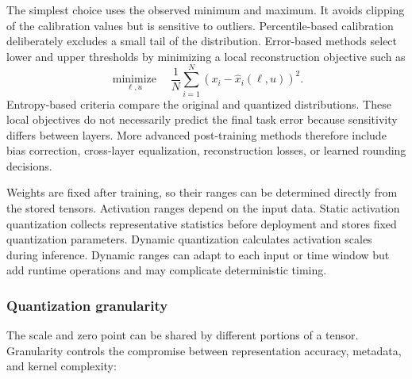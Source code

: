 \documentclass[
    a4paper,
    12pt,
    titlepage,
    bibliography=totoc,
    twoside=on,
    parskip=false,
    numbers=noenddot,
    cleardoublepage=empty,
    DIV=12,
    BCOR=12.0mm,
    headheight=36pt,
    headings=openright
]{scrreprt}
\begin{document}
The simplest choice uses the observed minimum and maximum. It avoids clipping of the calibration values but is sensitive to outliers. Percentile-based calibration deliberately excludes a small tail of the distribution. Error-based methods select lower and upper thresholds by minimizing a local reconstruction objective such as
\begin{equation}
    \underset{\ell,u}{\operatorname{minimize}}
    \quad
    \frac{1}{N}
    \sum_{i=1}^{N}
    \left(
    x_i-\widehat x_i(\ell,u)
    \right)^2.
    \label{eq:fundamental_quantization_range_mse}
\end{equation}
Entropy-based criteria compare the original and quantized distributions. These local objectives do not necessarily predict the final task error because sensitivity differs between layers. More advanced post-training methods therefore include bias correction, cross-layer equalization, reconstruction losses, or learned rounding decisions.\autocite{nagelAdaptiveRoundingPosttraining2020,nagelWhitePaperNeural2021}

Weights are fixed after training, so their ranges can be determined directly from the stored tensors. Activation ranges depend on the input data. Static activation quantization collects representative statistics before deployment and stores fixed quantization parameters. Dynamic quantization calculates activation scales during inference. Dynamic ranges can adapt to each input or time window but add runtime operations and may complicate deterministic timing.

\subsubsection{Quantization granularity}

The scale and zero point can be shared by different portions of a tensor. Granularity controls the compromise between representation accuracy, metadata, and kernel complexity:
\end{document}
